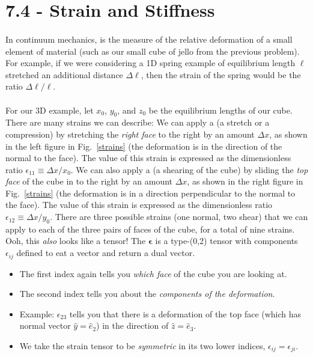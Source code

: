 \documentclass{article}
\begin{document}
\section*{7.4 - Strain and Stiffness}

\paragraph{}
In continuum mechanics,  is the measure of the relative deformation of a small element of material (such as our small cube of jello from the previous problem).
For example, if we were considering a 1D spring example of equilibrium length $\ell$ stretched an additional distance  $\Delta\ell$, then the strain of the spring would be the ratio 
$\Delta\ell/\ell$.  

\paragraph{}
For our 3D example, let $x_{0}$, $y_{0}$, and $z_{0}$ be the equilibrium lengths of our cube.  
There are many strains we can describe:  We can apply a  (a stretch or a compression) by stretching the \emph{right face} to the right by an amount 
$\Delta x$, as shown in the left figure in Fig.~\ref{strains} (the deformation is in the direction of the normal to the face).  
The value of this strain is expressed as the dimensionless ratio $\epsilon_{11} \equiv \Delta x/x_{0}$. 
We can also apply a  (a shearing of the cube) by sliding the \emph{top face} of the cube in to the right by an amount $\Delta x$, 
as shown in the right figure in Fig.~\ref{strains} (the deformation is in a direction perpendicular to the normal to the face).  
The value of this strain is expressed as the dimensionless ratio $\epsilon_{12} \equiv \Delta x/y_{0}$.
There are three possible strains (one normal, two shear) that we can apply to each of the three pairs of faces of the cube, for a total of nine strains.  Ooh, 
this \emph{also} looks like a tensor!
The  $\boldsymbol{\epsilon}$ is a type-(0,2) tensor with components $\epsilon_{ij}$ defined to eat a vector and return a dual vector.
	\begin{itemize}
		\item The first index again tells you \emph{which face} of the cube you are looking at.
		\item The second index tells you about the \emph{components of the deformation}.
		\item Example: $\epsilon_{23}$ tells you that there is a deformation of the top face (which has normal vector $\hat{y}=\hat{e}_{2}$) in the direction of $\hat{z}=\hat{e}_{3}$.
		\item We take the strain tensor to be \emph{symmetric} in its two lower indices, $\epsilon_{ij} = \epsilon_{ji}$.  
	\end{itemize}
\end{document}
